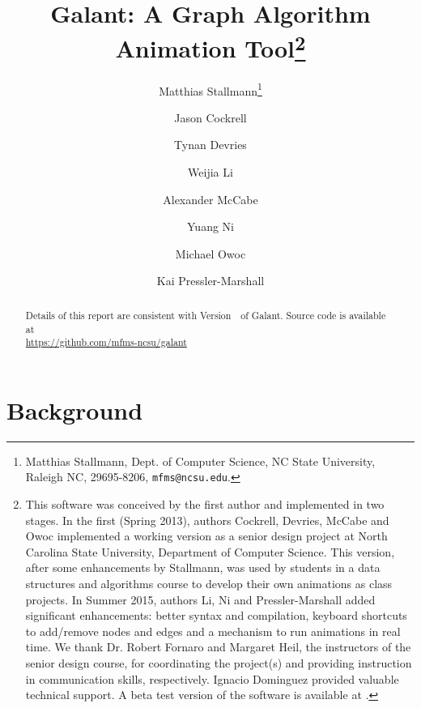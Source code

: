 \documentclass{article}
\begin{document}
\title{Galant: A Graph Algorithm Animation Tool\thanks{
    This software was conceived by the first author and implemented in
    two stages.
    In the first (Spring 2013), authors Cockrell, Devries, McCabe and Owoc implemented a
    working version as
    a senior design project at North Carolina
    State University, Department of Computer Science.
    This version, after some enhancements by Stallmann,
    was used by students in a data structures and algorithms course to develop
    their own animations as class projects.
    In Summer 2015, authors Li, Ni and Pressler-Marshall
    added significant enhancements: better syntax and compilation, keyboard shortcuts to add/remove nodes and edges and a mechanism to run animations in real time.
    We thank Dr. Robert Fornaro and Margaret Heil, the instructors of the senior design course, for
    coordinating the project(s) and providing instruction in communication
    skills, respectively. Ignacio Dominguez provided valuable technical
    support.
    A beta test version of the software is available at .
  }
}
\author{Matthias Stallmann\thanks{Matthias Stallmann, Dept. of Computer
    Science, NC State University, Raleigh NC, 29695-8206,
    \texttt{mfms@ncsu.edu}.
  }
  \and Jason Cockrell
  \and Tynan Devries
  \and Weijia Li
  \and Alexander McCabe
  \and Yuang Ni
  \and Michael Owoc
  \and Kai Pressler-Marshall
}

\maketitle

\begin{abstract}



Details of this report are consistent with Version~\VERSION\ of Galant.
Source code is available at\\
\hspace*{2em}\url{https://github.com/mfms-ncsu/galant}
 
\end{abstract}

\section{Background}
\end{document}
